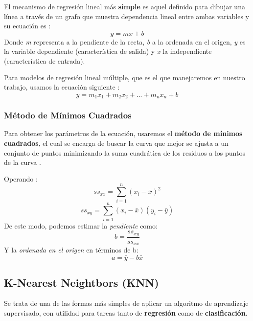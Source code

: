 El mecanismo de regresión lineal más \textbf{simple} es aquel definido para dibujar una línea a través de un grafo que muestra dependencia lineal entre ambas variables y su ecuación es \cite{Belyadi2021SupervisedLearning}:
\begin{equation}
    y=mx+b
\end{equation}
Donde \textit{m} representa a la pendiente de la recta, \textit{b} a la ordenada en el origen, \textit{y} es la variable dependiente (característica de salida) y \textit{x} la independiente (característica de entrada).

Para modelos de regresión lineal múltiple, que es el que manejaremos en nuestro trabajo, usamos la ecuación siguiente \cite{Belyadi2021SupervisedLearning}: 
\begin{equation}
    y = m_{1} x_{1} + m_{2} x_{2} + ... + m_{n}x_{n} + b
\end{equation}
\subsubsection{Método de Mínimos Cuadrados}
Para obtener los parámetros de la ecuación, usaremos el \textbf{método de mínimos cuadrados}, el cual se encarga de buscar la curva que mejor se ajusta a un conjunto de puntos minimizando la suma cuadrática de los residuos a los puntos de la curva \cite{WeissteinLeastFitting}.

Operando \cite{WeissteinLeastFitting}:
\begin{equation}
    ss_{xx} = \sum_{i=1}^{n}(x_{i}-\bar{x})^2
\end{equation}
\begin{equation}
        ss_{xy} = \sum_{i=1}^{n}(x_{i}-\bar{x})(y_{i}-\bar{y})
\end{equation}
De este modo, podemos estimar la \textit{pendiente} como:
\begin{equation}
    b = \frac{ss_{xy}}{ss_{xx}}
\end{equation}
Y la \textit{ordenada en el origen} en términos de b:
\begin{equation}
    a = \bar{y}-b\bar{x}
\end{equation}

\subsection{K-Nearest Neightbors (KNN)} 

Se trata de una de las formas más simples de aplicar un algoritmo de aprendizaje supervisado, con utilidad para tareas tanto de \textbf{regresión} como de \textbf{clasificación}.

